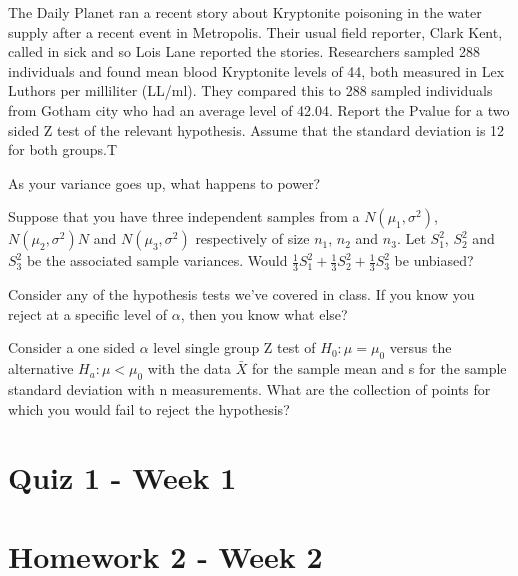\documentclass{homework}
\begin{document}
\begin{tcolorbox}[title=Question 9]
The Daily Planet ran a recent story about Kryptonite poisoning in the water supply after a recent event in Metropolis. Their usual field reporter, Clark Kent, called in sick and so Lois Lane reported the stories. Researchers sampled 288 individuals and found mean blood Kryptonite levels of 44, both measured in Lex Luthors per milliliter (LL/ml). They compared this to 288 sampled individuals from Gotham city who had an average level of 42.04. Report the Pvalue for a two sided Z test of the relevant hypothesis. Assume that the standard deviation is 12 for both groups.T
\end{tcolorbox}

\begin{tcolorbox}[title=Question 10]
As your variance goes up, what happens to power?
\end{tcolorbox}

\begin{tcolorbox}[title=Question 11]
Suppose that you have three independent samples from a $N(\mu_1, \sigma^2)$, $N(\mu_2, \sigma^2)N$ and $N(\mu_3, \sigma^2)$ respectively of size $n_1$, $n_2$ and $n_3$. Let $S_1^2$, $S_2^2$ and $S_3^2$ be the associated sample variances. Would $\frac{1}{3}S_1^2 + \frac{1}{3} S_2^2 + \frac{1}{3} S_3^2$ be unbiased?
\end{tcolorbox}

\begin{tcolorbox}[title=Question 12]
Consider any of the hypothesis tests we've covered in class. If you know you reject at a specific level of $\alpha$, then you know what else?
\end{tcolorbox}

\begin{tcolorbox}[title=Question 13]
Consider a one sided $\alpha$ level single group Z test of $H_0 : \mu = \mu_0$ versus the alternative $H_a : \mu < \mu_0$ with the data $\bar X$ for the sample mean and s for the sample standard deviation with n measurements. What are the collection of points for which you would fail to reject the hypothesis?
\end{tcolorbox}

\clearpage

\section{Quiz 1 - Week 1}

\begin{tcolorbox}[title=Question 1]
\end{tcolorbox}

\clearpage

\section{Homework 2 - Week 2}

\begin{tcolorbox}[title=Question 1]
\end{tcolorbox}

\clearpage
\end{document}
